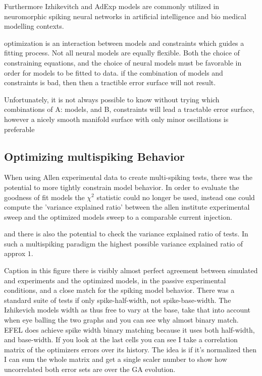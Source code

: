 Furthermore Izhikevitch and AdExp models are commonly utilized in neuromorphic spiking neural networks in artificial intelligence and bio medical modelling contexts.

optimization is an interaction between models and constraints which guides a fitting process. Not all neural models are equally flexible.  
Both the choice of constraining equations, and the choice of neural models must be favorable in order for models to be fitted to data.
if the combination of models and constraints is bad, then then a tractible error surface will not result.  

Unfortunately, it is not always possible to know without trying which combinations of A: models, and B, constraints will lead a tractable error surface, however a nicely smooth manifold surface with only minor oscillations is preferable


\subsection{Optimizing multispiking Behavior}

When using Allen experimental data to create multi-spiking tests, there was the potential to more tightly constrain model behavior. In order to evaluate the goodness of fit models the $\chi^{2}$ statistic could no longer be used, instead one could compute the 'variance explained ratio' between the allen institute experimental sweep and the optimized models sweep to a comparable current injection.

and there is also the potential to check the variance explained ratio of tests. In such a multispiking paradigm the highest possible variance explained ratio of approx $1$. 

Caption in this figure there is visibly almost perfect  agreement between simulated and experiments and the optimized models, in the passive experimental conditions, and a close match for the spiking model behavior. There was a standard suite of tests if only spike-half-width, not spike-base-width. The Izhikevich models width as thus free to vary at the base, take that into account when eye balling the two graphs and you can see why almost binary match. EFEL does achieve spike width binary matching because it uses both half-width, and base-width. If you look at the last cells you can see I take a correlation matrix of the optimizers errors over its history. The idea is if it's normalized then I can sum the whole matrix and get a single scaler number to show how uncorrelated both error sets are over the GA evolution. 

